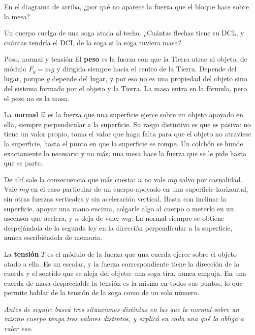 \documentclass[11pt,openany]{book}
\begin{document}
\begin{chequeo}
\item En el diagrama de arriba, ¿por qué no aparece la fuerza que el bloque hace sobre la mesa?
\item Un cuerpo cuelga de una soga atada al techo. ¿Cuántas flechas tiene su DCL, y cuántas tendría el DCL de la soga si la soga tuviera masa?
\end{chequeo}

\begin{bloque}{Peso, normal y tensión}
El \textbf{peso} es la fuerza con que la Tierra atrae al objeto, de módulo $F_g = mg$ y dirigida siempre hacia el centro de la Tierra. Depende del lugar, porque $g$ depende del lugar, y por eso no es una propiedad del objeto sino del sistema formado por el objeto y la Tierra. La masa entra en la fórmula, pero el peso no es la masa.

La \textbf{normal} $\vec n$ es la fuerza que una superficie ejerce sobre un objeto apoyado en ella, siempre perpendicular a la superficie. Su rasgo distintivo es que es pasiva: no tiene un valor propio, toma el valor que haga falta para que el objeto no atraviese la superficie, hasta el punto en que la superficie se rompe. Un colchón se hunde exactamente lo necesario y no más; una mesa hace la fuerza que se le pide hasta que se parte.

De ahí sale la consecuencia que más cuesta: $n$ no vale $mg$ salvo por casualidad. Vale $mg$ en el caso particular de un cuerpo apoyado en una superficie horizontal, sin otras fuerzas verticales y sin aceleración vertical. Basta con inclinar la superficie, apoyar una mano encima, colgarle algo al cuerpo o meterlo en un ascensor que acelera, y $n$ deja de valer $mg$. La normal siempre se obtiene despejándola de la segunda ley en la dirección perpendicular a la superficie, nunca escribiéndola de memoria.

La \textbf{tensión} $T$ es el módulo de la fuerza que una cuerda ejerce sobre el objeto atado a ella. Es un escalar, y la fuerza correspondiente tiene la dirección de la cuerda y el sentido que se aleja del objeto: una soga tira, nunca empuja. En una cuerda de masa despreciable la tensión es la misma en todos sus puntos, lo que permite hablar de la tensión de la soga como de un solo número.

\textit{Antes de seguir: buscá tres situaciones distintas en las que la normal sobre un mismo cuerpo tenga tres valores distintos, y explicá en cada una qué la obliga a valer eso.}
\end{bloque}
\end{document}
